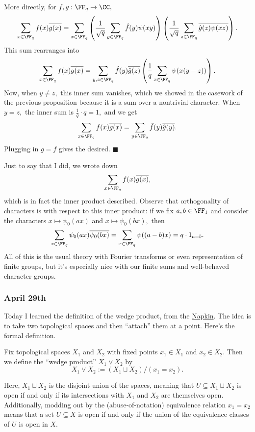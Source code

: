 More directly, for $f,g:\FF_q\to\CC,$
\[\sum_{x\in\FF_q}f(x)\overline{g(x)}=\sum_{x\in\FF_q}\left(\frac1{\sqrt q}\sum_{y\in\FF_q}\hat f(y)\psi(xy)\right)\left(\frac1{\sqrt q}\sum_{z\in\FF_q}\overline{\hat g(z)}\overline{\psi(xz)}\right).\]
This sum rearranges into
\[\sum_{x\in\FF_q}f(x)\overline{g(x)}=\sum_{y,z\in\FF_q}\hat f(y)\overline{\hat g(z)}\left(\frac1q\sum_{x\in\FF_q}\psi(x(y-z))\right).\]
Now, when $y\ne z,$ this inner sum vanishes, which we showed in the casework of the previous proposition because it is a sum over a nontrivial character. When $y=z,$ the inner sum is $\frac1q\cdot q=1,$ and we get
\[\sum_{x\in\FF_q}f(x)\overline{g(x)}=\sum_{y\in\FF_q}\hat f(y)\overline{\hat g(y)}.\]
Plugging in $g=f$ gives the desired. $\blacksquare$

Just to say that I did, we wrote down
\[\sum_{x\in\FF_q}f(x)\overline{g(x)},\]
which is in fact the inner product described. Observe that orthogonality of characters is with respect to this inner product: if we fix $a,b\in\FF_1$ and consider the characters $x\mapsto\psi_0(ax)$ and $x\mapsto\psi_0(bx),$ then
\[\sum_{x\in\FF_q}\psi_0(ax)\overline{\psi_0(bx)}=\sum_{x\in\FF_q}\psi((a-b)x)=q\cdot1_{a=b}.\]
All of this is the usual theory with Fourier transforms or even representation of finite groups, but it's especially nice with our finite sums and well-behaved character groups.

\subsubsection{April 29th}
Today I learned the definition of the wedge product, from the \href{https://web.archive.org/web/20210218161419/https://venhance.github.io/napkin/Napkin.pdf}{Napkin}. The idea is to take two topological spaces and then ``attach'' them at a point. Here's the formal definition.
\begin{definition}
    Fix topological spaces $X_1$ and $X_2$ with fixed points $x_1\in X_1$ and $x_2\in X_2.$ Then we define the ``wedge product'' $X_1\vee X_2$ by
    \[X_1\vee X_2:=(X_1\sqcup X_2)/(x_1=x_2).\]
\end{definition}
Here, $X_1\sqcup X_2$ is the disjoint union of the spaces, meaning that $U\subseteq X_1\sqcup X_2$ is open if and only if its intersections with $X_1$ and $X_2$ are themselves open. Additionally, modding out by the (abuse-of-notation) equivalence relation $x_1=x_2$ means that a set $U\subseteq X$ is open if and only if the union of the equivalence classes of $U$ is open in $X.$

